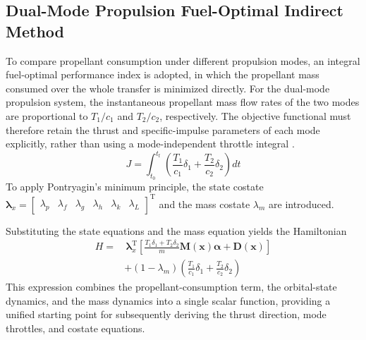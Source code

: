﻿\documentclass{IEEEtaes}
\begin{document}
\subsection{Dual-Mode Propulsion Fuel-Optimal Indirect Method}
To compare propellant consumption under different propulsion modes, an integral fuel-optimal performance index is adopted, in which the propellant mass consumed over the whole transfer is minimized directly. For the dual-mode propulsion system, the instantaneous propellant mass flow rates of the two modes are proportional to $T_1/c_1$ and $T_2/c_2$, respectively. The objective functional must therefore retain the thrust and specific-impulse parameters of each mode explicitly, rather than using a mode-independent throttle integral \cite{cline2024a}.
\begin{equation}
J=\int_{t_0}^{t_{\mathrm{f}}}\left(\frac{T_1}{c_1}\delta_1+\frac{T_2}{c_2}\delta_2\right)dt
\end{equation}
To apply Pontryagin's minimum principle, the state costate $\bm{\lambda}_x=\begin{bmatrix}\lambda_p&\lambda_f&\lambda_g&\lambda_h&\lambda_k&\lambda_L\end{bmatrix}^{\mathrm{T}}$ and the mass costate $\lambda_m$ are introduced.

Substituting the state equations and the mass equation yields the Hamiltonian
\begin{equation}
\begin{aligned}
H=&\,\bm{\lambda}_x^{\mathrm{T}}\left[\frac{T_1\delta_1+T_2\delta_2}{m}\bm{M}(\bm{x})\bm{\alpha}+\bm{D}(\bm{x})\right]\\
&+(1-\lambda_m)\left(\frac{T_1}{c_1}\delta_1+\frac{T_2}{c_2}\delta_2\right)
\end{aligned}
\end{equation}
This expression combines the propellant-consumption term, the orbital-state dynamics, and the mass dynamics into a single scalar function, providing a unified starting point for subsequently deriving the thrust direction, mode throttles, and costate equations.
\end{document}
